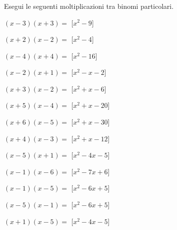 \subsubsection*{}

\begin{esercizio}
 \label{ese:11.}
Esegui le seguenti moltiplicazioni tra binomi particolari.
 \begin{multicols}{2}
\begin{enumeratea}
\item \(\left(x - 3\right)\left(x + 3\right)=\)
  \hfill [\(x^{2} - 9\)]
\item \(\left(x + 2\right)\left(x - 2\right)=\)
  \hfill [\(x^{2} - 4\)]
\item \(\left(x - 4\right)\left(x + 4\right)=\)
  \hfill [\(x^{2} - 16\)]
\item \(\left(x - 2\right)\left(x + 1\right)=\)
  \hfill [\(x^{2} - x - 2\)]
\item \(\left(x + 3\right)\left(x - 2\right)=\)
  \hfill [\(x^{2} + x - 6\)]
\item \(\left(x + 5\right)\left(x - 4\right)=\)
  \hfill [\(x^{2} + x - 20\)]
\item \(\left(x + 6\right)\left(x - 5\right)=\)
  \hfill [\(x^{2} + x - 30\)]
\item \(\left(x + 4\right)\left(x - 3\right)=\)
  \hfill [\(x^{2} + x - 12\)]
\item \(\left(x - 5\right)\left(x + 1\right)=\)
  \hfill [\(x^{2} - 4 x - 5\)]
\item \(\left(x - 1\right)\left(x - 6\right)=\)
  \hfill [\(x^{2} - 7 x + 6\)]
\item \(\left(x - 1\right)\left(x - 5\right)=\)
  \hfill [\(x^{2} - 6 x + 5\)]
\item \(\left(x - 5\right)\left(x - 1\right)=\)
  \hfill [\(x^{2} - 6 x + 5\)]
\item \(\left(x + 1\right)\left(x - 5\right)=\)
  \hfill [\(x^{2} - 4 x - 5\)]

\end{enumeratea}
\end{multicols}
\end{esercizio}
